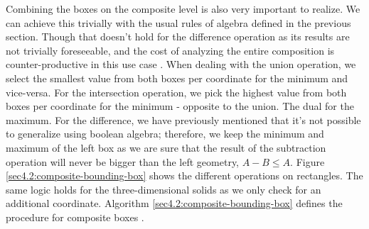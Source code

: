 \documentclass[a4paper,11pt,oneside]{article}
\begin{document}
Combining the boxes on the composite level is also very important to realize. We can achieve this trivially with the usual rules of algebra defined in the previous section. Though that doesn't hold for the difference operation as its results are not trivially foreseeable, and the cost of analyzing the entire composition is counter-productive in this use case \cite{ROTH1982109}. When dealing with the union operation, we select the smallest value from both boxes per coordinate for the minimum and vice-versa. For the intersection operation, we pick the highest value from both boxes per coordinate for the minimum - opposite to the union.
The dual for the maximum.  For the difference, we have previously mentioned that it's not possible to generalize using boolean algebra; therefore, we keep the minimum and maximum of the left box as we are sure that the result of the subtraction operation will never be bigger than the left geometry, $A - B \leq A$. Figure \ref{sec4.2:composite-bounding-box} shows the different operations on rectangles. The same logic holds for the three-dimensional solids as we only check for an additional coordinate. Algorithm \ref{sec4.2:composite-bounding-box} defines the procedure for composite boxes \cite{sbounds_csg}.
\end{document}
